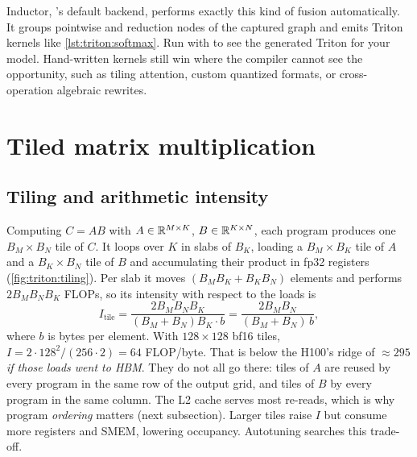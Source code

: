 \begin{systemslens}
Inductor, 's default backend, performs exactly this kind of
fusion automatically. It groups pointwise and reduction nodes of the captured graph and
emits Triton kernels like \cref{lst:triton:softmax}. Run with
 to see the generated Triton for your model. Hand-written
kernels still win where the compiler cannot see the opportunity, such as tiling
attention, custom quantized formats, or cross-operation algebraic rewrites.
\end{systemslens}

\section{Tiled matrix multiplication}\label{sec:triton:matmul}
\subsection{Tiling and arithmetic intensity}
Computing $C=AB$ with $A\in\mathbb{R}^{M\times K}$, $B\in\mathbb{R}^{K\times N}$, each program produces
one $B_M\times B_N$ tile of $C$. It loops over $K$ in slabs of $B_K$, loading a
$B_M\times B_K$ tile of $A$ and a $B_K\times B_N$ tile of $B$ and accumulating their
product in fp32 registers (\cref{fig:triton:tiling}). Per slab it moves
$(B_MB_K+B_KB_N)$ elements and performs $2B_MB_NB_K$ FLOPs, so its intensity with
respect to the loads is
\begin{equation}
  I_{\text{tile}} = \frac{2B_MB_NB_K}{(B_M+B_N)B_K\cdot b} = \frac{2B_MB_N}{(B_M+B_N)\,b},
\end{equation}
where $b$ is bytes per element. With $128\times128$ bf16 tiles,
$I=2\cdot128^2/(256\cdot2)=64$ FLOP/byte. That is below the H100's ridge of
$\approx295$ \emph{if those loads went to HBM}. They do not all go there: tiles of $A$
are reused by every program in the same row of the output grid, and tiles of $B$ by
every program in the same column. The L2 cache serves most re-reads, which is why
program \emph{ordering} matters (next subsection). Larger tiles raise $I$ but consume
more registers and SMEM, lowering occupancy. Autotuning searches this trade-off.


